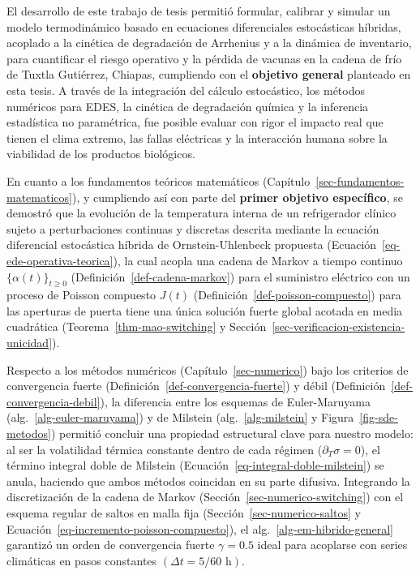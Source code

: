 \documentclass[
  spanish,
  us-letterpaper,
]{scrreprt}
\numberwithin{equation}{section}
\theoremstyle{plain}
\theoremstyle{plain}
\theoremstyle{plain}
\theoremstyle{definition}
\theoremstyle{remark}
\begin{document}
El desarrollo de este trabajo de tesis permitió formular, calibrar y
simular un modelo termodinámico basado en ecuaciones diferenciales
estocásticas híbridas, acoplado a la cinética de degradación de
Arrhenius y a la dinámica de inventario, para cuantificar el riesgo
operativo y la pérdida de vacunas en la cadena de frío de Tuxtla
Gutiérrez, Chiapas, cumpliendo con el \textbf{objetivo general}
planteado en esta tesis. A través de la integración del cálculo
estocástico, los métodos numéricos para EDES, la cinética de degradación
química y la inferencia estadística no paramétrica, fue posible evaluar
con rigor el impacto real que tienen el clima extremo, las fallas
eléctricas y la interacción humana sobre la viabilidad de los productos
biológicos.

En cuanto a los fundamentos teóricos matemáticos
(Capítulo~\ref{sec-fundamentos-matematicos}), y cumpliendo así con parte
del \textbf{primer objetivo específico}, se demostró que la evolución de
la temperatura interna de un refrigerador clínico sujeto a
perturbaciones continuas y discretas descrita mediante la ecuación
diferencial estocástica híbrida de Ornstein-Uhlenbeck propuesta
(Ecuación~\ref{eq-ede-operativa-teorica}), la cual acopla una cadena de
Markov a tiempo continuo \(\{\alpha(t)\}_{t \ge 0}\)
(Definición~\ref{def-cadena-markov}) para el suministro eléctrico con un
proceso de Poisson compuesto \(J(t)\)
(Definición~\ref{def-poisson-compuesto}) para las aperturas de puerta
tiene una única solución fuerte global acotada en media cuadrática
(Teorema~\ref{thm-mao-switching} y
Sección~\ref{sec-verificacion-existencia-unicidad}).

Respecto a los métodos numéricos (Capítulo~\ref{sec-numerico}) bajo los
criterios de convergencia fuerte
(Definición~\ref{def-convergencia-fuerte}) y débil
(Definición~\ref{def-convergencia-debil}), la diferencia entre los
esquemas de Euler-Maruyama (alg.~\ref{alg-euler-maruyama}) y de Milstein
(alg.~\ref{alg-milstein} y Figura~\ref{fig-sde-metodos}) permitió
concluir una propiedad estructural clave para nuestro modelo: al ser la
volatilidad térmica constante dentro de cada régimen
(\(\partial_T \sigma = 0\)), el término integral doble de Milstein
(Ecuación~\ref{eq-integral-doble-milstein}) se anula, haciendo que ambos
métodos coincidan en su parte difusiva. Integrando la discretización de
la cadena de Markov (Sección~\ref{sec-numerico-switching}) con el
esquema regular de saltos en malla fija
(Sección~\ref{sec-numerico-saltos} y
Ecuación~\ref{eq-incremento-poisson-compuesto}), el
alg.~\ref{alg-em-hibrido-general} garantizó un orden de convergencia
fuerte \(\gamma = 0.5\) ideal para acoplarse con series climáticas en
pasos constantes \(\left( \Delta t = 5/60\text{ h} \right)\).
\end{document}
